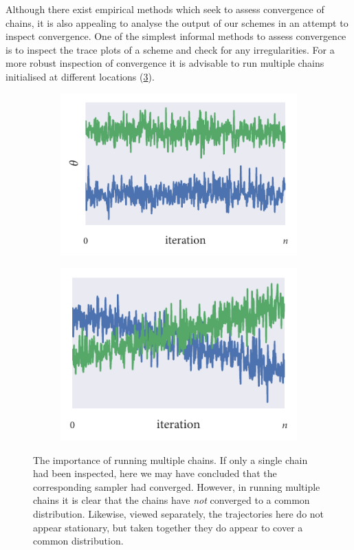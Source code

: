 Although there exist empirical methods which seek to assess convergence of
chains, it is also appealing to analyse the output of our schemes in an attempt
to inspect convergence. One of the simplest informal methods to assess
convergence is to inspect the trace plots of a scheme and check for any
irregularities. For a more robust inspection of convergence it is advisable to
run multiple chains initialised at different locations
(\cref{fig:convergence}).
\begin{figure}[tb]
  \begin{subfigure}[b]{0.5\textwidth}
    \centering
    \includegraphics{B.pdf}
    \subcaption{}
    \label{fig:B}
  \end{subfigure}%
  \begin{subfigure}[b]{0.5\textwidth}
    \centering
    \includegraphics{W.pdf}
    \subcaption{}
    \label{fig:W}
  \end{subfigure}
  \caption{The importance of running multiple chains.  If only a
    single chain had been inspected, here we may have concluded that the
    corresponding sampler had converged. However, in running multiple chains
    it is clear that the chains have \emph{not} converged to a common
    distribution.  Likewise, viewed separately, the trajectories
    here do not appear stationary, but taken together they do appear to cover a
    common distribution.}
  \label{fig:convergence}
\end{figure}

